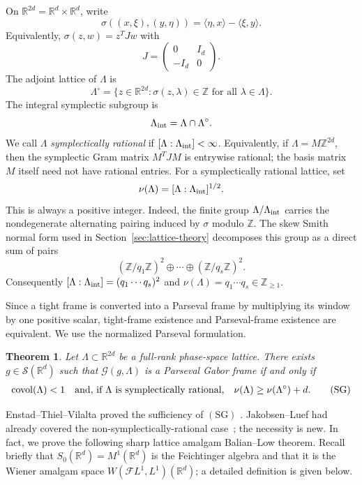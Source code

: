 \documentclass[11pt,reqno]{amsart}
\numberwithin{equation}{section}
\newtheorem{theorem}{Theorem}[section]
\theoremstyle{definition}
\theoremstyle{remark}
\newcommand{\R}{\mathbb R}
\newcommand{\Z}{\mathbb Z}
\newcommand{\covol}{\operatorname{covol}}
\newcommand{\G}{\mathcal G}
\newcommand{\Sclass}{\mathcal S}
\newcommand{\ip}[2]{\langle #1,#2\rangle}
\newcommand{\SG}{\ensuremath{(\mathrm{SG})}\xspace}
\newcommand{\Szero}{S_0}
\begin{document}
On $\R^{2d}=\R^d\times\R^d$, write
\[
 \sigma((x,\xi),(y,\eta))=\ip{\eta}{x}-\ip{\xi}{y}.
\]
Equivalently, $\sigma(z,w)=z^TJw$ with
\[
 J=\begin{pmatrix}0&I_d\\-I_d&0\end{pmatrix}.
\]
The adjoint lattice of $\Lambda$ is
\[
 \Lambda^\circ=\{z\in\R^{2d}:\sigma(z,\lambda)\in\Z
 \text{ for all }\lambda\in\Lambda\}.
\]
The integral symplectic subgroup is
\[
 \Lambda_{\rm int}=\Lambda\cap\Lambda^\circ.
\]
We call $\Lambda$ \emph{symplectically rational} if
$[\Lambda:\Lambda_{\rm int}]<\infty$.  Equivalently, if
$\Lambda=M\Z^{2d}$, then the symplectic Gram matrix $M^TJM$ is entrywise
rational; the basis matrix $M$ itself need not have rational entries.  For a
symplectically rational lattice, set
\[
 \nu(\Lambda)=[\Lambda:\Lambda_{\rm int}]^{1/2}.
\]
This is always a positive integer.  Indeed, the finite group
$\Lambda/\Lambda_{\rm int}$ carries the nondegenerate alternating pairing
induced by $\sigma$ modulo $\Z$.  The skew Smith normal form used in
Section~\ref{sec:lattice-theory} decomposes this group as a direct sum of
pairs
\[
 (\Z/q_1\Z)^2\oplus\cdots\oplus(\Z/q_s\Z)^2.
\]
Consequently
$[\Lambda:\Lambda_{\rm int}]=(q_1\cdots q_s)^2$ and
$\nu(\Lambda)=q_1\cdots q_s\in\Z_{\ge1}$.

Since a tight frame is converted into a Parseval frame by multiplying its
window by one positive scalar, tight-frame existence and Parseval-frame
existence are equivalent.  We use the normalized Parseval formulation.

\begin{theorem}\label{thm:main-gabor}
Let $\Lambda\subset\R^{2d}$ be a full-rank phase-space lattice.  There exists
$g\in\Sclass(\R^d)$ such that $\G(g,\Lambda)$ is a Parseval Gabor frame if and
only if
\begin{align}
 \covol(\Lambda)<1
 \quad\text{and, if $\Lambda$ is symplectically rational,}\quad
 \nu(\Lambda)\ge \nu(\Lambda^\circ)+d.
 \tag{\ensuremath{\mathrm{SG}}}\label{eq:SG}
\end{align}
\end{theorem}

Enstad--Thiel--Vilalta proved the sufficiency of \SG
\cite{EnstadThielVilalta2025}.  Jakobsen--Luef had already covered the
non-symplectically-rational case~\cite{JakobsenLuef2020}; the necessity is
new.  In fact, we prove the following sharp lattice amalgam Balian--Low
theorem.  Recall briefly that $\Szero(\R^d)=M^1(\R^d)$ is the
Feichtinger algebra and that it is the Wiener amalgam space
$W(\mathcal F L^1,L^1)(\R^d)$; a detailed definition is given below.
\end{document}
